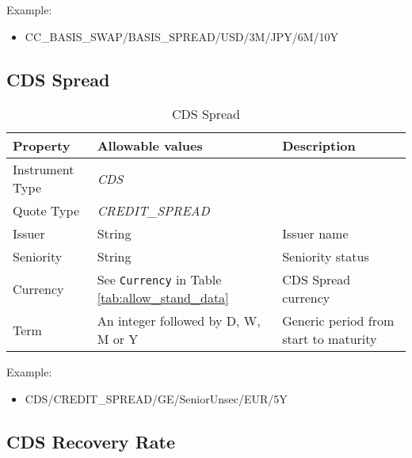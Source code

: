 \medskip
Example:
\begin{itemize}
\item {CC\_BASIS\_SWAP/BASIS\_SPREAD/USD/3M/JPY/6M/10Y}
\end{itemize}

\subsection{CDS Spread}

\begin{table}[H]
\centering
  \begin{tabular}{|p{3cm}|p{3.5cm}|p{7cm}|}
    \hline
    {\bf Property} & {\bf Allowable values} & {\bf Description} \\ \hline
    Instrument Type & \emph{CDS} & \\ \hline
    Quote Type & \emph{CREDIT\_SPREAD} & \\ \hline
    Issuer & String &  Issuer name \\ \hline
    Seniority & String &  Seniority status \\ \hline
    Currency & See \lstinline!Currency! in Table \ref{tab:allow_stand_data} & CDS Spread currency\\ \hline
    Term & An integer followed by D, W, M or Y & Generic period from start to maturity\\ \hline
  \end{tabular}
  \caption{CDS Spread}
  \label{tab:cdsspread_quote}
\end{table}

Example:
\begin{itemize}
\item {CDS/CREDIT\_SPREAD/GE/SeniorUnsec/EUR/5Y}
\end{itemize}

\subsection{CDS Recovery Rate}

